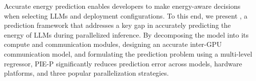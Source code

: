 Accurate energy prediction enables developers to make energy-aware decisions when selecting LLMs and deployment configurations. To this end, we present \sys{}, a prediction framework that addresses a key gap in accurately predicting the energy of LLMs during parallelized inference. By decomposing the model into its compute and communication modules, designing an accurate inter-GPU communication model, and formulating the prediction problem using a multi-level regressor, PIE-P significantly reduces prediction error across models, hardware platforms, and  three  popular parallelization strategies.

